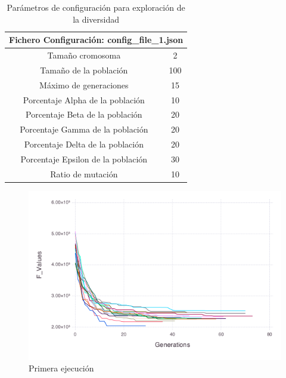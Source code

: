 \begin{table}[]
    \centering
    \begin{tabular}{||c|c||}
        \hline
        \multicolumn{2}{|l|}{\textbf{Fichero Configuración: config\_file\_1.json}} \\ \hline
        Tamaño cromosoma                                & 2               \\ \hline
        Tamaño de la población                          & 100             \\ \hline
        Máximo de generaciones                          & 15              \\ \hline
        Porcentaje Alpha de la población                & 10              \\ \hline
        Porcentaje Beta de la población                 & 20              \\ \hline
        Porcentaje Gamma de la población                & 20              \\ \hline
        Porcentaje Delta de la población                & 20              \\ \hline
        Porcentaje Epsilon de la población              & 30              \\ \hline
        Ratio de mutación                               & 10              \\ \hline
    \end{tabular}
    \caption{Parámetros de configuración para exploración de la diversidad}
    \label{tab:diversity_config}
\end{table}

\begin{figure}[H]
	\centering	
	\includegraphics[scale=0.6]{figuras/config_file_1_Rastrigin.png}
	\caption{Primera ejecución}
    \label{fig:primera_ejecucion}
\end{figure}

